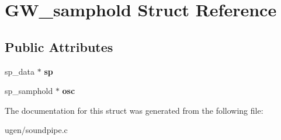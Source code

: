 \hypertarget{structGW__samphold}{}\section{G\+W\+\_\+samphold Struct Reference}
\label{structGW__samphold}
\subsection*{Public Attributes}
\begin{DoxyCompactItemize}
\item 
\hypertarget{structGW__samphold_aad39d317244a6512dd5a67bca3f40a34}{}\label{structGW__samphold_aad39d317244a6512dd5a67bca3f40a34} 
sp\+\_\+data $\ast$ {\bfseries sp}
\item 
\hypertarget{structGW__samphold_a8257b223557ad793db5c1c8294243a11}{}\label{structGW__samphold_a8257b223557ad793db5c1c8294243a11} 
sp\+\_\+samphold $\ast$ {\bfseries osc}
\end{DoxyCompactItemize}


The documentation for this struct was generated from the following file\+:\begin{DoxyCompactItemize}
\item 
ugen/soundpipe.\+c\end{DoxyCompactItemize}
